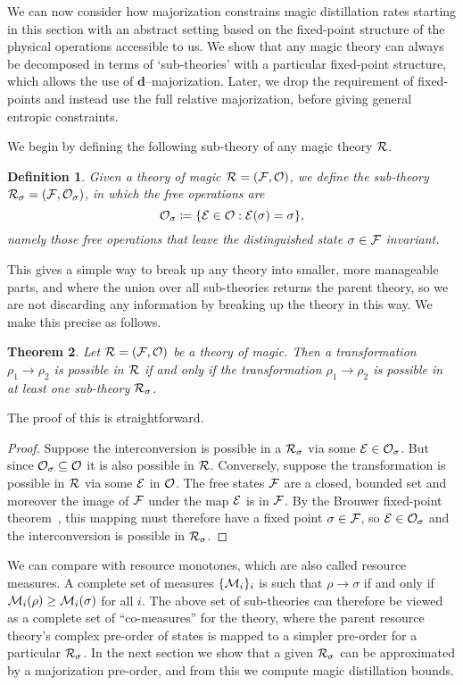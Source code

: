 \documentclass[
onecolumn,
superscriptaddress
]{revtex4-1}
\newcommand{\revhigh}[1]{{\color{red}#1}}
\newtheorem{theorem}{Theorem}
\newtheorem{definition}[theorem]{Definition}
\def\d{\boldsymbol{d}}
\def\E{{\cal E}}
\def\R{{\cal R}}
\def\M{{\cal M}}
\def\F{{\cal F}}
\renewcommand{\O}{{\cal O}}
\begin{document}
We can now consider how majorization constrains magic distillation rates starting in this section with an abstract setting based on the fixed-point structure of the physical operations accessible to us. We show that any magic theory can always be decomposed in terms of `sub-theories' with a particular fixed-point structure, which allows the use of $\d$--majorization. 
\revhigh{Later, we drop the requirement of fixed-points and instead use the full relative majorization, before giving general entropic constraints.}
 
 We begin by defining the following sub-theory of any magic theory $\R$.
\begin{definition}\label{def:sigmafrag}
   Given a theory of magic $\R = (\F, \O)$, we define the sub-theory $\R_\sigma = (\F, \O_\sigma)$, in which the free operations are 
   \begin{equation}
        \O_\sigma \coloneqq \{ \E \in \O: \E(\sigma) = \sigma \},
    \end{equation}
namely those free operations that leave the distinguished state $\sigma \in \F$ invariant.
\end{definition}
This gives a simple way to break up any theory into smaller, more manageable parts, and where the union over all sub-theories returns the parent theory, so we are not discarding any information by breaking up the theory in this way. We make this precise as follows.
\begin{theorem}\label{thm:frag}
    Let $\R = (\F, \O)$ be a theory of magic.
Then a transformation $\rho_1 \rightarrow \rho_2$ is possible in $\R$ if and only if the transformation $\rho_1 \rightarrow \rho_2$ is possible in at least one sub-theory $\R_\sigma$.
\end{theorem}
\noindent The proof of this is straightforward.
\begin{proof}
   Suppose the interconversion is possible in a $\R_\sigma$ via some $\E \in \O_\sigma$. But since $\O_\sigma \subseteq \O$ it is also possible in $\R$. Conversely, suppose the transformation is possible in $\R$ via some $\E$ in $\O$. The free states $\F$ are a closed, bounded set and moreover the image of $\F$ under the map $\E$ is in $\F$. By the Brouwer fixed-point theorem~\cite{cit:brouwer}, this mapping must therefore have a fixed point $\sigma \in \F$, so $\E \in \O_\sigma$ and the interconversion is possible in $\R_\sigma$.
\end{proof}
We can compare with resource monotones, which are also called resource measures. A complete set of measures $\{\M_i\}_i$ is such that $\rho \rightarrow \sigma$ if and only if $\M_i(\rho) \ge \M_i(\sigma)$ for all $i$. The above set of sub-theories can therefore be viewed as a complete set of ``co-measures'' for the theory, where the parent resource theory's complex pre-order of states is mapped to a simpler pre-order for a particular $\R_\sigma$. 
In the next section we show that a given $\R_\sigma$ can be approximated by a majorization pre-order, and from this we compute magic distillation bounds.
\end{document}
